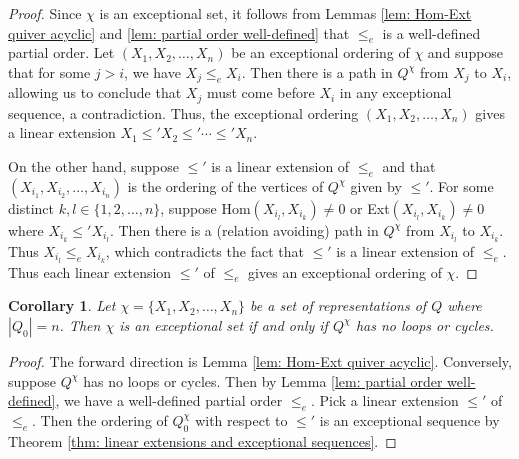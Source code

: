 \documentclass[12pt]{amsart}
\theoremstyle{plain}
\newtheorem{cor}[thm]{Corollary}
\theoremstyle{definition}
\theoremstyle{remark}
\begin{document}
\begin{proof}
Since $\chi$ is an exceptional set, it follows from Lemmas \ref{lem: Hom-Ext quiver acyclic} and \ref{lem: partial order well-defined} that $\leq_e$ is a well-defined partial order. Let $(X_1, X_2, \dots, X_n)$ be an exceptional ordering of $\chi$ and suppose that for some $j > i$, we have $X_j \leq_e X_i$. Then there is a path in $Q^{\chi}$ from $X_j$ to $X_i$, allowing us to conclude that $X_j$ must come before $X_i$ in any exceptional sequence, a contradiction. {\color{black} Thus, the exceptional ordering $(X_1, X_2, \dots, X_n)$ gives a linear extension $X_1 \leq' X_2 \leq' \cdots \leq' X_n$.}

On the other hand, suppose $\leq'$ is a linear extension of $\leq_e$ and that $(X_{i_1}, X_{i_2}, \dots, X_{i_n})$ is the ordering of the vertices of $Q^{\chi}$ given by $\leq'$. For some distinct $k,l \in \{1,2,\dots,n\}$, suppose Hom$(X_{i_l},X_{i_k}) \neq 0$ or Ext$(X_{i_l}, X_{i_k}) \neq 0$ where $X_{i_k} \leq' X_{i_l}$. Then there is a (relation avoiding) path in $Q^{\chi}$ from $X_{i_l}$ to $X_{i_k}$. Thus $X_{i_l} \leq_e X_{i_k}$, which contradicts the fact that $\leq'$ is a linear extension of $\leq_e$. {\color{black} Thus each linear extension $\leq'$ of $\leq_e$ gives an exceptional ordering of $\chi$.}
\end{proof}

\begin{cor}
Let $\chi = \{X_1, X_2, \dots, X_n\}$ be a set of representations of $Q$ where $|Q_0| = n$. Then $\chi$ is an exceptional set if and only if $Q^{\chi}$ has no loops or cycles.
\end{cor}

\begin{proof}
The forward direction is Lemma \ref{lem: Hom-Ext quiver acyclic}. Conversely, suppose $Q^{\chi}$ has no loops or cycles. Then by Lemma \ref{lem: partial order well-defined}, we have a well-defined partial order $\leq_e$. Pick a linear extension $\leq'$ of $\leq_e$. Then the ordering of $Q_0^{\chi}$ with respect to $\leq'$ is an exceptional sequence {\color{black} by Theorem \ref{thm: linear extensions and exceptional sequences}.}
\end{proof}
\end{document}
